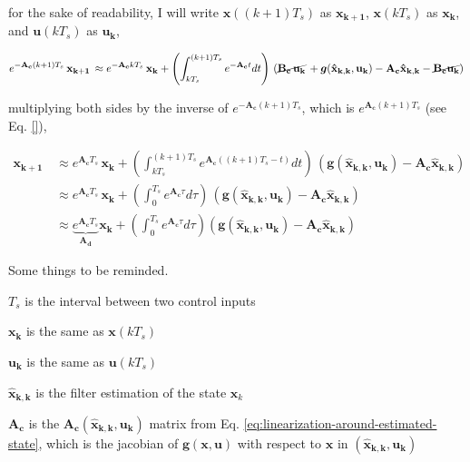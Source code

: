 \documentclass[12pt]{article}
\begin{document}
for the sake of readability, I will write $\mathbf{x}((k+1)T_s)$ as $\mathbf{x_{k+1}}$, $\mathbf{x}(kT_s)$ as $\mathbf{x_k}$, and $\mathbf{u}(kT_s)$ as $\mathbf{u_k}$, 

\begin{equation*}
    e^{\mathbf{-A_c} (k+1)T_s} \, \mathbf{x_{k+1}} \, \approx e^{\mathbf{-A_c}kT_s} \, \mathbf{x_k} + \left(\int_{kT_s}^{(k+1)T_s} e^{\mathbf{-A_c} t} dt \right) \, ( \cancel{\mathbf{B_c}\,\mathbf{u_k}} \,+ \boldsymbol{g}(\mathbf{\hat{x}_{k, k}}, \mathbf{u_k}) - \mathbf{A_c \hat{x}_{k,k}} - \cancel{\mathbf{B_c u_k}} ) 
\end{equation*}

multiplying both sides by the inverse of $e^{\mathbf{-A_c} (k+1)T_s}$, which is $e^{\mathbf{A_c} (k+1)T_s}$ (see Eq. \ref{}),

\begin{equation} \begin{aligned}
    \mathbf{x_{k+1}} \, &\approx e^{\mathbf{A_c}T_s} \, \mathbf{x_k} + \left(\int_{kT_s}^{(k+1)T_s} e^{\mathbf{A_c}((k+1)T_s - t)} dt \right) \, (\boldsymbol{g}(\mathbf{\hat{x}_{k, k}}, \mathbf{u_k}) - \mathbf{A_c \hat{x}_{k,k} } )\\
    &\approx e^{\mathbf{A_c}T_s} \, \mathbf{x_k} + \left(\int_{0}^{T_s} e^{\mathbf{A_c}\tau} d\tau \right) \, (\boldsymbol{g}(\mathbf{\hat{x}_{k, k}}, \mathbf{u_k}) - \mathbf{A_c \hat{x}_{k,k}}) \\
    &\approx  \underbrace{e^{\mathbf{A_c}T_s}}_{\mathbf{A_d}} \mathbf{x_k} + \left(\int_{0}^{T_s} e^{\mathbf{A_c}\tau} d\tau\right) (\boldsymbol{g}(\mathbf{\hat{x}_{k, k}}, \mathbf{u_k}) - \mathbf{A_c \hat{x}_{k,k}})
\end{aligned}
\label{eq:discrete-linearized-system-around-estimated state}
\end{equation}

\noindent Some things to be reminded.
\begin{description}[labelindent=10pt, labelsep=10pt]
    \item $T_s$ is the interval between two control inputs
    \item $\mathbf{x_k}$ is the same as $\mathbf{x}(kT_s)$
    \item $\mathbf{u_k}$ is the same as $\mathbf{u}(kT_s)$
    \item $\mathbf{\hat{x}_{k, k}}$ is the filter estimation of the state $\mathbf{x}_k$
    \item $\mathbf{A_c}$ is the $\mathbf{A_c}(\mathbf{\hat{x}_{k, k}}, \mathbf{u_k})$ matrix from Eq. \ref{eq:linearization-around-estimated-state}, which is the jacobian of $\boldsymbol{g}(\mathbf{x}, \mathbf{u})$ with respect to $\mathbf{x}$ in $(\mathbf{\hat{x}_{k, k}}, \mathbf{u_k})$
\end{description}
\end{document}
